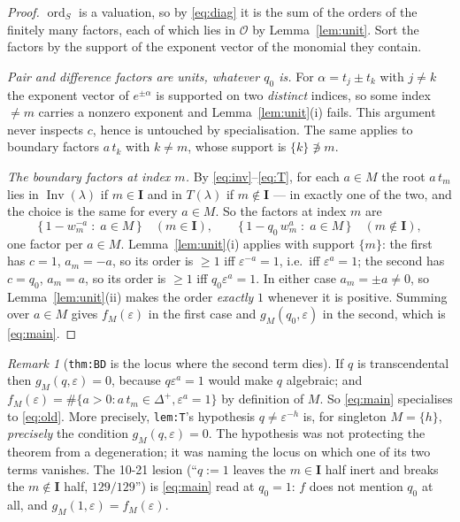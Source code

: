 \documentclass[11pt]{article}
\theoremstyle{definition}
\theoremstyle{remark}
\newtheorem{rem}[thm]{Remark}
\DeclareMathOperator{\Inv}{Inv}
\DeclareMathOperator{\ord}{ord}
\newcommand{\bI}{\mathbf{I}}
\begin{document}
\begin{proof}
$\ord_S$ is a valuation, so by \eqref{eq:diag} it is the sum of the orders of the finitely
many factors, each of which lies in $\mathcal{O}$ by Lemma~\ref{lem:unit}.  Sort the
factors by the support of the exponent vector of the monomial they contain.

\emph{Pair and difference factors are units, whatever $q_0$ is.}  For
$\alpha=t_j\pm t_k$ with $j\ne k$ the exponent vector of $e^{\pm\alpha}$ is supported on
two \emph{distinct} indices, so some index $\ne m$ carries a nonzero exponent and
Lemma~\ref{lem:unit}(i) fails.  This argument never inspects $c$, hence is untouched by
specialisation.  The same applies to boundary factors $a\,t_k$ with $k\ne m$, whose
support is $\{k\}\not\ni m$.

\emph{The boundary factors at index $m$.}  By \eqref{eq:inv}--\eqref{eq:T}, for each
$a\in M$ the root $a\,t_m$ lies in $\Inv(\lambda)$ if $m\in\bI$ and in $T(\lambda)$ if
$m\notin\bI$ --- in exactly one of the two, and the choice is the same for every $a\in M$.
So the factors at index $m$ are
\[
  \{\,1-w_m^{-a}\;:\;a\in M\,\}\quad(m\in\bI),
  \qquad
  \{\,1-q_0\,w_m^{a}\;:\;a\in M\,\}\quad(m\notin\bI),
\]
one factor per $a\in M$.  Lemma~\ref{lem:unit}(i) applies with support $\{m\}$: the first
has $c=1$, $a_m=-a$, so its order is $\ge1$ iff $\varepsilon^{-a}=1$, i.e.\ iff
$\varepsilon^{a}=1$; the second has $c=q_0$, $a_m=a$, so its order is $\ge1$ iff
$q_0\varepsilon^{a}=1$.  In either case $a_m=\pm a\ne0$, so Lemma~\ref{lem:unit}(ii) makes
the order \emph{exactly} $1$ whenever it is positive.  Summing over $a\in M$ gives
$f_M(\varepsilon)$ in the first case and $g_M(q_0,\varepsilon)$ in the second, which is
\eqref{eq:main}.
\end{proof}

\begin{rem}[\texttt{thm:BD} is the locus where the second term dies]
\label{rem:recovers}
If $q$ is transcendental then $g_M(q,\varepsilon)=0$, because $q\varepsilon^{a}=1$ would
make $q$ algebraic; and $f_M(\varepsilon)=\#\{a>0: a\,t_m\in\Delta^{+},\varepsilon^{a}=1\}$
by definition of $M$.  So \eqref{eq:main} specialises to \eqref{eq:old}.  More precisely,
\texttt{lem:T}'s hypothesis $q\ne\varepsilon^{-h}$ is, for singleton $M=\{h\}$,
\emph{precisely} the condition $g_M(q,\varepsilon)=0$.  The hypothesis was not protecting
the theorem from a degeneration; it was naming the locus on which one of its two terms
vanishes.  The 10-21 lesion (``$q:=1$ leaves the $m\in\bI$ half inert and breaks the
$m\notin\bI$ half, $129/129$'') is \eqref{eq:main} read at $q_0=1$: $f$ does not mention
$q_0$ at all, and $g_M(1,\varepsilon)=f_M(\varepsilon)$.
\end{rem}
\end{document}
